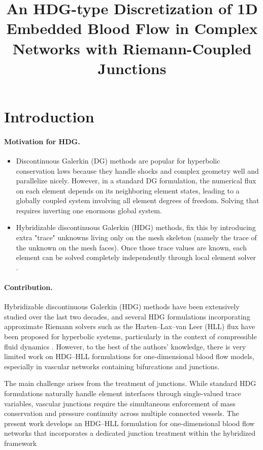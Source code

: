 \documentclass[11pt]{article}
\title{An HDG-type Discretization of 1D Embedded Blood Flow in Complex Networks with Riemann-Coupled Junctions}
\author{}
\date{}
\begin{document}
\maketitle
\section{Introduction}
\paragraph{Motivation for HDG.}
\begin{itemize}
\item 
Discontinuous Galerkin (DG) methods are popular for hyperbolic conservation laws because they handle shocks and complex geometry well and parallelize nicely. However, in a standard DG formulation, the numerical flux on each element depends on its neighboring element states, leading to a globally coupled system involving all element degrees of freedom. Solving that requires inverting one enormous global system. 

\item Hybridizable discontinuous Galerkin (HDG) methods, fix this by introducing extra "trace" unknowns living only on the mesh skeleton (namely the trace of the unknown on the mesh faces). Once those trace values are known, each element can be solved completely independently through local element solver \cite{MR3345205}.
\end{itemize}
\paragraph{Contribution.}
Hybridizable discontinuous Galerkin (HDG) methods have
been extensively studied over the last two decades, and
several HDG formulations incorporating approximate
Riemann solvers such as the Harten--Lax--van Leer (HLL)
flux have been proposed for hyperbolic systems,
particularly in the context of compressible fluid
dynamics \cite{peraire2010hybridizable,vila2021hybridisable}.
However, to the best of the authors' knowledge, there is
very limited work on HDG--HLL formulations for
one-dimensional blood flow models, especially in vascular
networks containing bifurcations and junctions.

The main challenge arises from the treatment of
junctions. While standard HDG formulations naturally
handle element interfaces through single-valued trace
variables, vascular junctions require the simultaneous
enforcement of mass conservation and pressure continuity
across multiple connected vessels. The present work
develops an HDG--HLL formulation for one-dimensional
blood flow networks that incorporates a dedicated
junction treatment within the hybridized framework
\end{document}
